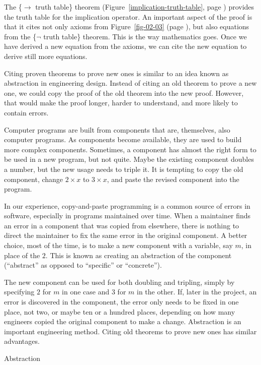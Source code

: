 The \{$\rightarrow$ truth table\} theorem
(Figure~\ref{implication-truth-table}, page \pageref{implication-truth-table})
provides the truth table
for the implication operator.
An important aspect of the proof is that it cites
not only axioms from Figure~\ref{fig-02-03} (page \pageref{fig-02-03}),
but also equations from the \{$\neg$ truth table\} theorem.
This is the way mathematics goes. Once we have derived
a new equation from the axioms, we can cite
the new equation to derive still more equations.

\begin{aside}
Citing proven theorems to prove new ones
is similar to an idea known as
abstraction
in engineering design.
Instead of citing an old theorem to prove a new one,
we could copy the proof of the old theorem into the new proof.
However, that would make the proof longer, harder to understand,
and more likely to contain errors.

Computer programs are built from components that are, themselves,
also computer programs. As components become available,
they are used to build more complex components.
Sometimes, a component has almost the right form
to be used in a new program, but not quite.
Maybe the existing component doubles a number,
but the new usage needs to triple it.
It is tempting to copy the
old component, change $2 \times x$ to $3 \times x$,
and paste the revised component into the program.

In our experience, copy-and-paste
programming is a common source of errors in software,
especially in programs maintained
over time. When a maintainer finds an error in
a component that was copied from elsewhere,
there is nothing to direct the maintainer to fix
the same error in the original component.
A better choice, most of the time,
is to make a new component with
a variable, say $m$, in place of the $2$.
This is known as creating an abstraction of the component
(``abstract'' as opposed to ``specific'' or ``concrete'').

The new component can be used for both doubling and tripling,
simply by specifying $2$ for $m$ in one case and $3$ for $m$ in the other.
If, later in the project, an error is discovered in the component,
the error only needs to be fixed in one place, not two,
or maybe ten or a hundred places, depending on how many engineers
copied the original component to make a change.
Abstraction is an important engineering method.
Citing old theorems to prove new ones has similar advantages.
\caption{Abstraction}
\label{abstraction}
\end{aside}

